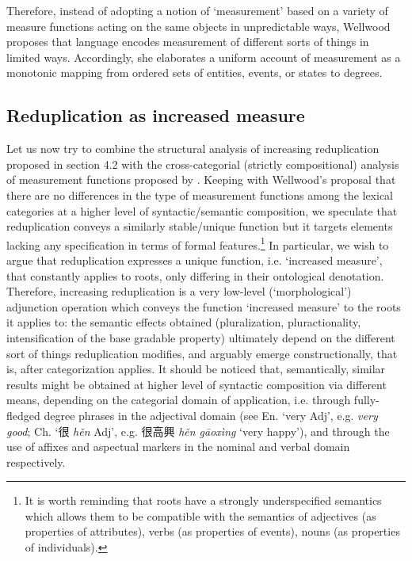 \documentclass[output=paper]{langsci/langscibook}
\begin{document}
Therefore, instead of adopting a notion of `measurement' based on a
variety of measure functions acting on the same objects in unpredictable
ways, Wellwood proposes that language encodes measurement of different
sorts of things in limited ways. Accordingly, she elaborates a uniform
account of measurement as a monotonic mapping from ordered sets of
entities, events, or states to degrees.

\subsection{Reduplication as increased measure}

Let us now try to combine the structural analysis of increasing
reduplication proposed in section 4.2 with the cross-categorial
(strictly compositional) analysis of measurement functions proposed by
%
\citet{Wellwood2014,Wellwood2015}%
%
. Keeping with Wellwood's proposal that there are
no differences in the type of measurement functions among the lexical
categories at a higher level of syntactic/semantic composition, we
speculate that reduplication conveys a similarly stable/unique function
but it targets elements lacking any specification in terms of formal
features.\footnote{It is worth reminding that roots have a strongly
  underspecified semantics which allows them to be compatible with the
  semantics of adjectives (as properties of attributes), verbs (as
  properties of events), nouns (as properties of individuals).} In
particular, we wish to argue that reduplication expresses a unique
function, i.e. `increased measure', that constantly applies to roots,
only differing in their ontological denotation. Therefore, increasing
reduplication is a very low-level (`morphological') adjunction operation
which conveys the function `increased measure' to the roots it applies
to: the semantic effects obtained (pluralization, pluractionality,
intensification of the base gradable property) ultimately depend on the
different sort of things reduplication modifies, and arguably emerge
constructionally, that is, after  categorization applies. It should
be noticed that, semantically, similar results might be obtained at
higher level of syntactic composition via different means, depending on
the categorial domain of application, i.e. through fully-fledged degree
phrases in the adjectival domain (see En. `very Adj', e.g. \emph{very
good}; Ch. `很 \emph{hěn} Adj', e.g. 很高興 \emph{hěn gāoxìng} `very
happy'), and through the use of  affixes and aspectual markers in
the nominal and verbal domain respectively.
\end{document}
